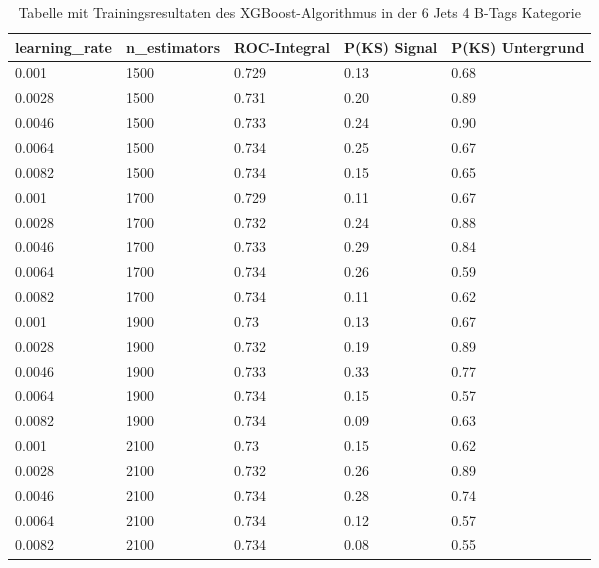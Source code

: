 \begin{table}[tbp]\parbox{12cm}{
  \caption[XGBoost 6j4t Ergebnisse]{Tabelle mit Trainingsresultaten des XGBoost-Algorithmus in der 6 Jets 4 B-Tags Kategorie}%
  }\label{tab:xgboost_6j4t}
  \begin{center}
  \begin{tabular}{lllll}
  \hline
  learning\_rate & n\_estimators & ROC-Integral & P(KS) Signal & P(KS) Untergrund\\
  \hline
\num{0,001}  & \num{1500} & \num{0,729} & \num{0,13} & \num{0,68}\\
\num{0,0028} & \num{1500} & \num{0,731} & \num{0,20} & \num{0,89}\\
\num{0,0046} & \num{1500} & \num{0,733} & \num{0,24} & \num{0,90}\\
\num{0,0064} & \num{1500} & \num{0,734} & \num{0,25} & \num{0,67}\\
\num{0,0082} & \num{1500} & \num{0,734} & \num{0,15} & \num{0,65}\\
\num{0,001}  & \num{1700} & \num{0,729} & \num{0,11} & \num{0,67}\\
\num{0,0028} & \num{1700} & \num{0,732} & \num{0,24} & \num{0,88}\\
\num{0,0046} & \num{1700} & \num{0,733} & \num{0,29} & \num{0,84}\\
\num{0,0064} & \num{1700} & \num{0,734} & \num{0,26} & \num{0,59}\\
\num{0,0082} & \num{1700} & \num{0,734} & \num{0,11} & \num{0,62}\\
\num{0,001}  & \num{1900} & \num{0,73}  & \num{0,13} & \num{0,67}\\
\num{0,0028} & \num{1900} & \num{0,732} & \num{0,19} & \num{0,89}\\
\num{0,0046} & \num{1900} & \num{0,733} & \num{0,33} & \num{0,77}\\
\num{0,0064} & \num{1900} & \num{0,734} & \num{0,15} & \num{0,57}\\
\num{0,0082} & \num{1900} & \num{0,734} & \num{0,09} & \num{0,63}\\
\num{0,001}  & \num{2100} & \num{0,73}  & \num{0,15} & \num{0,62}\\
\num{0,0028} & \num{2100} & \num{0,732} & \num{0,26} & \num{0,89}\\
\num{0,0046} & \num{2100} & \num{0,734} & \num{0,28} & \num{0,74}\\
\num{0,0064} & \num{2100} & \num{0,734} & \num{0,12} & \num{0,57}\\
\num{0,0082} & \num{2100} & \num{0,734} & \num{0,08} & \num{0,55}\\

\end{tabular}
\end{center}
\end{table}
